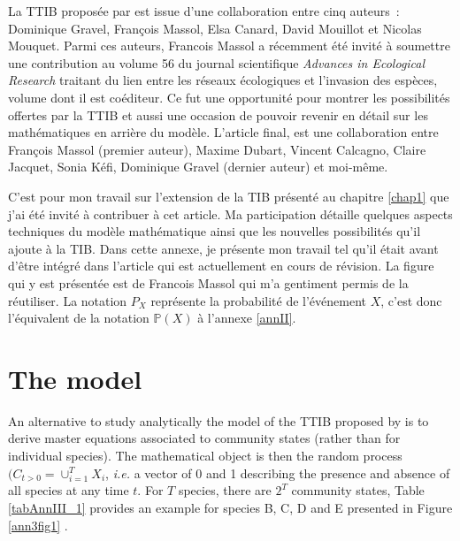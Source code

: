 \label{annIII}
\addtocounter{chapter}{1}
\setcounter{equation}{0}


La TTIB proposée par \cite{Gravel2011} est issue d'une collaboration entre cinq auteurs~:
Dominique Gravel, François Massol, Elsa Canard, David Mouillot et Nicolas Mouquet.
Parmi ces auteurs, Francois Massol a récemment été invité à soumettre une
contribution au volume 56 du journal scientifique
\emph{Advances in Ecological Research} traitant du lien entre les réseaux
écologiques et l'invasion des espèces, volume dont il est coéditeur.
Ce fut une opportunité pour montrer les possibilités offertes par la TTIB et aussi
une occasion de pouvoir revenir en détail sur les mathématiques en arrière du modèle.
L'article final, est une collaboration entre François Massol
(premier auteur), Maxime Dubart, Vincent Calcagno, Claire Jacquet, Sonia Kéfi,
Dominique Gravel (dernier auteur) et moi-même.

C'est pour mon travail sur l'extension de la TIB présenté au chapitre \ref{chap1}
que j'ai été invité à contribuer à cet article. Ma participation détaille
quelques aspects techniques du modèle mathématique ainsi que les nouvelles
possibilités qu'il ajoute à la TIB.
Dans cette annexe, je présente mon travail tel qu'il était avant d'être intégré
dans l'article qui est actuellement en cours de révision.
La figure qui y est présentée est de Francois Massol qui m'a gentiment permis
de la réutiliser. La notation $P_{X}$ représente la probabilité de l'événement
$X$, c'est donc l'équivalent de la notation $\mathbb{P}(X)$ à l'annexe \ref{annII}.



\section{The model}\label{the-model}

An alternative to study analytically the model of the TTIB proposed by \cite{Gravel2011}
is to derive master equations associated to community states (rather than for individual species).
The mathematical object is then the random process
$(C_{t>0}=\cup_{i=1}^TX_i$, \emph{i.e.} a vector of 0 and 1 describing
the presence and absence of all species at any time \(t\). For \(T\)
species, there are \(2^T\) community states, Table \ref{tabAnnIII_1} provides an example
for species B, C, D and E presented in Figure \ref{ann3fig1} .


